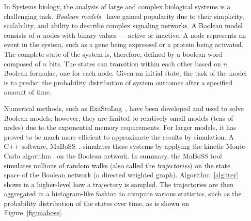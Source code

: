 



In Systems biology, the analysis of large and complex biological systems is a challenging task. \emph{Boolean models}~\cite{wang2012boolean} have gained popularity due to their simplicity, scalability, and ability to describe complex signaling networks. A Boolean model consists of $n$ nodes with binary values --- active or inactive. A node represents an event in the system, such as a gene being expressed or a protein being activated. The complete state of the system is, therefore, defined by a boolean word composed of $n$ bits. The states can transition within each other based on $n$ Boolean formulae, one for each node. Given an initial state, the task of the model is to predict the probability distribution of system outcomes after a specified amount of time.

Numerical methods, such as ExaStoLog~\cite{koltai2020exact}, have been developed and used to solve Boolean models; however, they are limited to relatively small models (tens of nodes) due to the exponential memory requirements. For larger models, it has proved to be much more efficient to approximate the results by simulation. A C++ software, MaBoSS~\cite{stoll2017maboss}, simulates these systems by applying the kinetic Monte-Carlo algorithm~\cite{stoll2012continuous} on the Boolean network. In summary, the MaBoSS tool simulates millions of random walks (also called the \emph{trajectories}) on the state space of the Boolean network (a directed weighted graph). Algorithm~\ref{alg:iter} shows in a higher-level how a trajectory is sampled. The trajectories are then aggregated in a histogram-like fashion to compute various statistics, such as the probability distribution of the states over time, as is shown on Figure~\ref{fig:maboss}.

